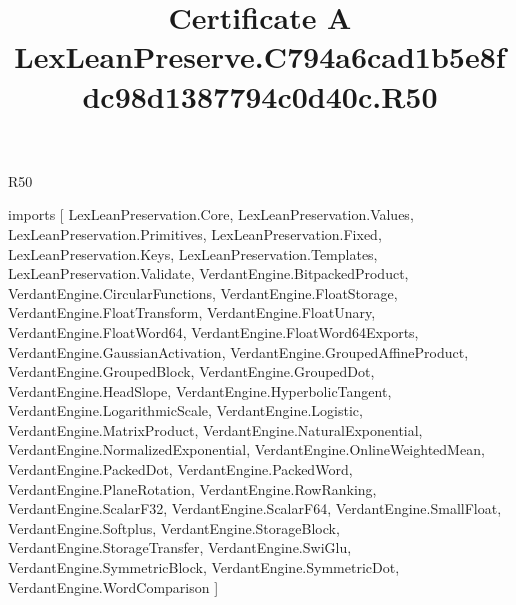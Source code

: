 \begin{lexlean}{R50}
\title{Certificate A LexLeanPreserve.C794a6cad1b5e8fdc98d1387794c0d40c.R50}
\begin{coremodule}
imports [
  LexLeanPreservation.Core,
  LexLeanPreservation.Values,
  LexLeanPreservation.Primitives,
  LexLeanPreservation.Fixed,
  LexLeanPreservation.Keys,
  LexLeanPreservation.Templates,
  LexLeanPreservation.Validate,
  VerdantEngine.BitpackedProduct,
  VerdantEngine.CircularFunctions,
  VerdantEngine.FloatStorage,
  VerdantEngine.FloatTransform,
  VerdantEngine.FloatUnary,
  VerdantEngine.FloatWord64,
  VerdantEngine.FloatWord64Exports,
  VerdantEngine.GaussianActivation,
  VerdantEngine.GroupedAffineProduct,
  VerdantEngine.GroupedBlock,
  VerdantEngine.GroupedDot,
  VerdantEngine.HeadSlope,
  VerdantEngine.HyperbolicTangent,
  VerdantEngine.LogarithmicScale,
  VerdantEngine.Logistic,
  VerdantEngine.MatrixProduct,
  VerdantEngine.NaturalExponential,
  VerdantEngine.NormalizedExponential,
  VerdantEngine.OnlineWeightedMean,
  VerdantEngine.PackedDot,
  VerdantEngine.PackedWord,
  VerdantEngine.PlaneRotation,
  VerdantEngine.RowRanking,
  VerdantEngine.ScalarF32,
  VerdantEngine.ScalarF64,
  VerdantEngine.SmallFloat,
  VerdantEngine.Softplus,
  VerdantEngine.StorageBlock,
  VerdantEngine.StorageTransfer,
  VerdantEngine.SwiGlu,
  VerdantEngine.SymmetricBlock,
  VerdantEngine.SymmetricDot,
  VerdantEngine.WordComparison
]


\end{coremodule}
\end{lexlean}
